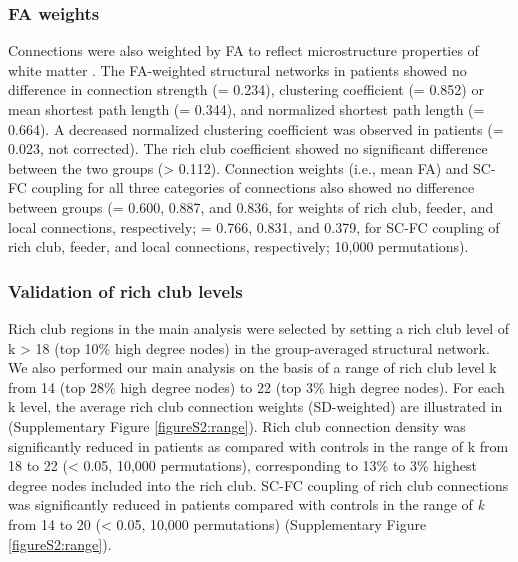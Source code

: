 \begin{refsection}
\subsubsection*{FA weights}
Connections were also weighted by FA to reflect microstructure properties of white matter \citep{Beaulieu2002TheBO}. The FA-weighted structural networks in patients showed no difference in connection strength (\pval = 0.234), clustering coefficient (\pval = 0.852) or mean shortest path length (\pval = 0.344), and normalized shortest path length (\pval = 0.664). A decreased normalized clustering coefficient was observed in patients (\pval = 0.023, not corrected). The rich club coefficient showed no significant difference between the two groups (\pval > 0.112). Connection weights (i.e., mean FA) and SC-FC coupling for all three categories of connections also showed no difference between groups (\pval = 0.600, 0.887, and 0.836, for weights of rich club, feeder, and local connections, respectively; \pval = 0.766, 0.831, and 0.379, for SC-FC coupling of rich club, feeder, and local connections, respectively; 10,000 permutations).

\subsubsection*{Validation of rich club levels}
Rich club regions in the main analysis were selected by setting a rich club level of k > 18 (top 10\% high degree nodes) in the group-averaged structural network. We also performed our main analysis on the basis of a range of rich club level k from 14 (top 28\% high degree nodes) to 22 (top 3\% high degree nodes). For each k level, the average rich club connection weights (SD-weighted) are illustrated in (Supplementary Figure \ref{figureS2:range}). Rich club connection density was significantly reduced in patients as compared with controls in the range of k from 18 to 22 (\pval  < 0.05, 10,000 permutations), corresponding to 13\% to 3\% highest degree nodes included into the rich club. SC-FC coupling of rich club connections was significantly reduced in patients compared with controls in the range of \textit{k} from 14 to 20 (\pval < 0.05, 10,000 permutations) (Supplementary Figure \ref{figureS2:range}).


\end{refsection}
